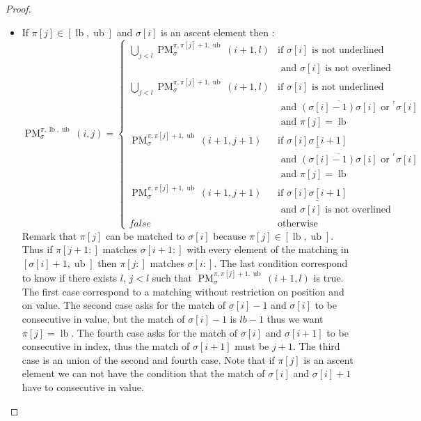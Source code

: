 \documentclass[a4paper]{llncs}
\newcommand{\ptext}{\pi}
\newcommand{\ppattern}{\sigma}
\DeclareMathOperator{\PMa}{PM}
\newcommand{\PM}[6]{\PMa_{{#1}}^{{#2},{#3},{#4}}({#5},{#6})}
\DeclareMathOperator{\lb}{lb}
\DeclareMathOperator{\ub}{ub}
\begin{document}
\begin{proof}
\begin{itemize}
	\item If $\ptext[j] \in [\lb,\ub]$ and $\ppattern[i]$ is an ascent element then :
	$$
	\PM{\sigma}{\ptext}{\lb}{\ub}{i}{j}=
	\begin{cases}
		\bigcup_{j<l} \PM{\sigma}{\ptext}{\ptext[j]+1}{\ub}{i+1}{l}
			& \text{if $\ppattern[i]$ is not underlined } \\
			& \text{ and $\ppattern[i]$ is not overlined} \\
		\bigcup_{j<l} \PM{\sigma}{\ptext}{\ptext[j]+1}{\ub}{i+1}{l}
			& \text{if $\ppattern[i]$ is not underlined } \\
			& \text{ and $\overline{(\ppattern[i]-1)\ppattern[i]}$ or $^\ulcorner{\ppattern[i]}$}\\
			& \text{ and $\ptext[j]=\lb$} \\
		\PM{\sigma}{\ptext}{\ptext[j]+1}{\ub}{i+1}{j+1}
			& \text{if $\underline{\ppattern[i]\ppattern[i+1]}$ } \\
			& \text{ and $\overline{(\ppattern[i]-1)\ppattern[i]}$ or $^\ulcorner{\ppattern[i]}$}\\
			& \text{ and $\ptext[j]=\lb$} \\
		\PM{\sigma}{\ptext}{\ptext[j]+1}{\ub}{i+1}{j+1}
			& \text{if $\underline{\ppattern[i]\ppattern[i+1]}$ } \\
			& \text{ and $\ppattern[i]$ is not overlined} \\
		false & \text{otherwise}

	\end{cases}
	$$	
	Remark that $\ptext[j]$ can be matched to $\ppattern[i]$ because $\ptext[j] \in [\lb,\ub]$.
	Thus if $\ptext[j+1:]$ matches $\ppattern[i+1:]$  with every element of the matching in $[\ppattern[i]+1,\ub]$ then 
 	$\ptext[j:]$ matches $\ppattern[i:]$. The last condition correspond 
 	to know if there exists $l$, $j<l$ such that
	$\PM{\sigma}{\ptext}{\ptext[j]+1}{\ub}{i+1}{l}$ is true.
	The first case correspond to a matching without restriction on position and on value. The second case asks for the match of $\ppattern[i]-1$ and $\ppattern[i]$ to be consecutive in value, but the match of $\ppattern[i]-1$
	is $lb-1$ thus we want $\ptext[j]=\lb$. The fourth case asks for the match of $\ppattern[i]$ and $\ppattern[i+1]$ to be consecutive in index, thus the match of $\ppattern[i+1]$ must be $j+1$. The third case is an union of the second and fourth case. Note that if $\pi[j]$ is an ascent element we can not have the condition that the match of $\ppattern[i]$ and $\ppattern[i]+1$ have to consecutive in value.
	

\end{itemize}
\end{proof}
\end{document}
